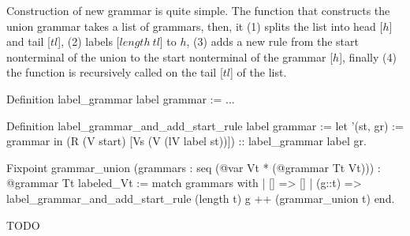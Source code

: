 Construction of new grammar is quite simple. The function that constructs the union grammar takes a list of grammars, then, it (1) splits the list into head [$h$] and tail [$tl$], (2) labels [$length \ tl$] to $h$, (3) adds a new rule from the start nonterminal of the union to the start nonterminal of the grammar [$h$], finally (4) the function is recursively called on the tail [$tl$] of the list.

\begin{listing}[h]
    \begin{pyglist}[language=coq, numbers=none, numbersep=5pt]
  Definition label_grammar label grammar := ...

  Definition label_grammar_and_add_start_rule 
               label 
               grammar :=
    let '(st, gr) := grammar in 
    (R (V start) [Vs (V (lV label st))]) 
       :: label_grammar label gr.        

  Fixpoint grammar_union 
     (grammars : seq (@var Vt * (@grammar Tt Vt)))
       : @grammar 
     Tt 
     labeled_Vt :=
    match grammars with
    |  [] => []
    |  (g::t) => 
         label_grammar_and_add_start_rule 
           (length t) 
           g ++ (grammar_union t)
    end.
    \end{pyglist}
    \caption{TODO}
    \label{lst:verbments1}
\end{listing}

%
%
%




